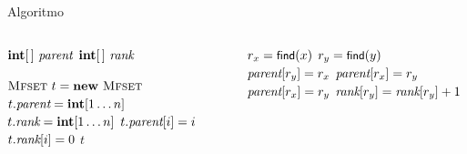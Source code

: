 \begin{frame}{Algoritmo}

\vspace{-15pt}
\begin{columns}[T]
\begin{Procedure}
\caption[T]{\mfset \phantom{\mfmerge($\INTEGER\ x, \INTEGER\ y$)}}	

$\INTEGER[\,]\ \mfparent$\;
$\INTEGER[\,]\ \mfrank$\;
\BlankLine

\mfset {}
{
  $\mfset\ t = \NEW\ \mfset$\;
  $t.\mfparent = \INTEGER[1 \mldots n]$\;
  $t.\mfrank = \INTEGER[1 \mldots n]$\;
  {
    $t.\textit{parent}[i] = i$\;
    $t.\textit{rank}[i] = 0$\;
  }
  \Return $t$\;
}
\end{Procedure}

\begin{Procedure}
\caption[A]{\mfmerge($\INTEGER\ x, \INTEGER\ y$)}
{
  $r_x = \textsf{{\small find}}(x)$\;
  $r_y = \textsf{{\small find}}(y)$\;
  {
    \uIf{$\mfrank[r_x] > \mfrank[r_y]$}
    {
      $\textit{parent}[r_y] = r_x$\;
    }
    \uElseIf{$\mfrank[r_y] > \mfrank[r_x]$}
    {
      $\textit{parent}[r_x] = r_y$\;
    }
    \Else
    {
      $\textit{parent}[r_x] = r_y$\;
      $\textit{rank}[r_y] = \textit{rank}[r_y]+1$
    }
  }
}
\end{Procedure}
\end{columns}

\end{frame}

